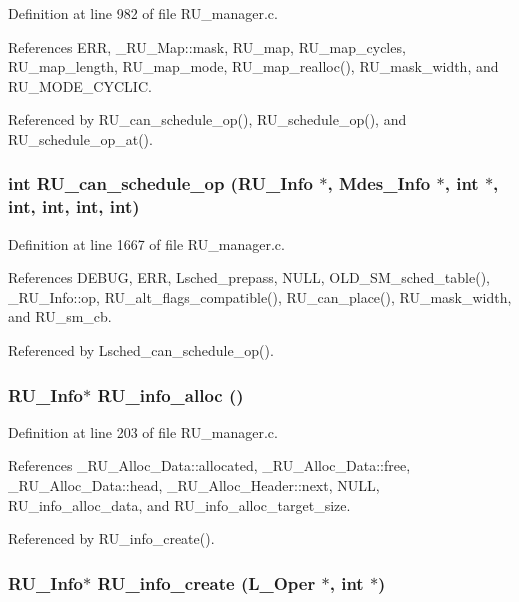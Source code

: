 Definition at line 982 of file RU\_\-manager.c.

References ERR, \_\-RU\_\-Map::mask, RU\_\-map, RU\_\-map\_\-cycles, RU\_\-map\_\-length, RU\_\-map\_\-mode, RU\_\-map\_\-realloc(), RU\_\-mask\_\-width, and RU\_\-MODE\_\-CYCLIC.

Referenced by RU\_\-can\_\-schedule\_\-op(), RU\_\-schedule\_\-op(), and RU\_\-schedule\_\-op\_\-at().
\subsubsection{\setlength{\rightskip}{0pt plus 5cm}int RU\_\-can\_\-schedule\_\-op (\bf{RU\_\-Info} $\ast$, Mdes\_\-Info $\ast$, int $\ast$, int, int, int, int)}\label{RU__manager_8h_ef4276ddd21694a495c73ed3cb2f8b0e}




Definition at line 1667 of file RU\_\-manager.c.

References DEBUG, ERR, Lsched\_\-prepass, NULL, OLD\_\-SM\_\-sched\_\-table(), \_\-RU\_\-Info::op, RU\_\-alt\_\-flags\_\-compatible(), RU\_\-can\_\-place(), RU\_\-mask\_\-width, and RU\_\-sm\_\-cb.

Referenced by Lsched\_\-can\_\-schedule\_\-op().
\subsubsection{\setlength{\rightskip}{0pt plus 5cm}\bf{RU\_\-Info}$\ast$ RU\_\-info\_\-alloc ()}\label{RU__manager_8h_e25d4f480fef627b2aa2c3c0f0dd7f6a}




Definition at line 203 of file RU\_\-manager.c.

References \_\-RU\_\-Alloc\_\-Data::allocated, \_\-RU\_\-Alloc\_\-Data::free, \_\-RU\_\-Alloc\_\-Data::head, \_\-RU\_\-Alloc\_\-Header::next, NULL, RU\_\-info\_\-alloc\_\-data, and RU\_\-info\_\-alloc\_\-target\_\-size.

Referenced by RU\_\-info\_\-create().
\subsubsection{\setlength{\rightskip}{0pt plus 5cm}\bf{RU\_\-Info}$\ast$ RU\_\-info\_\-create (L\_\-Oper $\ast$, int $\ast$)}\label{RU__manager_8h_32cacbeadb930b21ae8c8ba7e8c09024}




